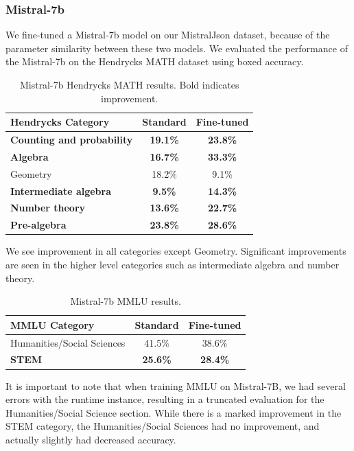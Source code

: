 \subsubsection{Mistral-7b}

We fine-tuned a Mistral-7b model on our MistralJson dataset, because of the parameter similarity between these two models. We evaluated the performance of the Mistral-7b on the Hendrycks MATH dataset using boxed accuracy.

\begin{table}[h]
\centering
\begin{tabular}{lcc}
\toprule
\textbf{Hendrycks Category} & \textbf{Standard} & \textbf{Fine-tuned} \\
\midrule
\textbf{Counting and probability} & \textbf{19.1\%} & \textbf{23.8\%} \\
\textbf{Algebra} & \textbf{16.7\%} & \textbf{33.3\%} \\
Geometry & 18.2\% & 9.1\% \\
\textbf{Intermediate algebra} & \textbf{9.5\%} & \textbf{14.3\%} \\
\textbf{Number theory} & \textbf{13.6\%} & \textbf{22.7\%} \\
\textbf{Pre-algebra} & \textbf{23.8\%} & \textbf{28.6\%} \\
\bottomrule
\end{tabular}
\caption{Mistral-7b Hendrycks MATH results. Bold indicates improvement.}
\end{table}

We see improvement in all categories except Geometry. Significant improvements are seen in the higher level categories such as intermediate algebra and number theory.

\begin{table}[h]
\centering
\begin{tabular}{lcc}
\toprule
\textbf{MMLU Category} & \textbf{Standard} & \textbf{Fine-tuned} \\
\midrule
Humanities/Social Sciences & 41.5\% & 38.6\% \\
\textbf{STEM} & \textbf{25.6\%} & \textbf{28.4\%} \\
\bottomrule
\end{tabular}
\caption{Mistral-7b MMLU results.}
\end{table}

It is important to note that when training MMLU on Mistral-7B, we had several errors with the runtime instance, resulting in a truncated evaluation for the Humanities/Social Science section. While there is a marked improvement in the STEM category, the Humanities/Social Sciences had no improvement, and actually slightly had decreased accuracy.

